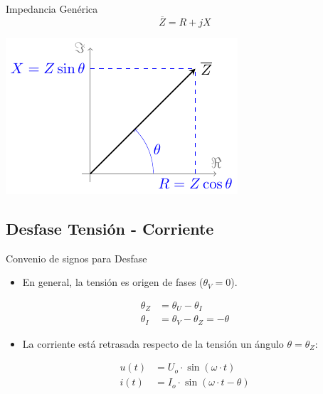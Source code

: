\documentclass[xcolor={usenames,svgnames,dvipsnames}]{beamer}
\begin{document}
\begin{frame}[label={sec:orga9eb4ec}]{Impedancia Genérica}
\[
\overline{Z} = R + j X
\]

\begin{center}
\includegraphics[width=.9\linewidth]{../figs/fasorImpedancia.pdf}
\end{center}
\end{frame}

\subsection{Desfase Tensión - Corriente}
\label{sec:org195ad6f}
\begin{frame}[label={sec:org728b45f}]{Convenio de signos para Desfase}
\begin{itemize}
\item En general, la tensión es origen de fases (\(\theta_{V}=0\)).
\end{itemize}
\begin{align*}
\theta_Z &= \theta_U - \theta_I\\
\theta_{I} &= \theta_{V}- \theta_{Z} = -\theta
\end{align*}

\begin{itemize}
\item La corriente está retrasada respecto de la tensión un ángulo \(\theta = \theta_Z\):
\end{itemize}
\begin{align*}
  u(t) &= U_{o}\cdot\sin(\omega \cdot t)\\
  i(t) &= I_{o}\cdot\sin(\omega \cdot t - \theta)
\end{align*}
\end{frame}
\end{document}
